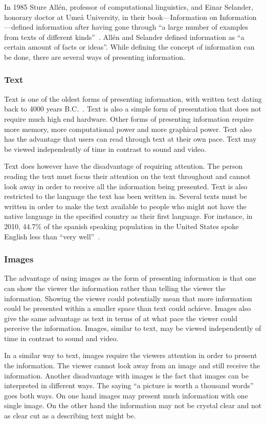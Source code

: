 In 1985 Sture All{\'e}n, professor of computational linguistics, and Einar Selander, honorary doctor at Ume{\aa} University, in their book---Information on Information---defined information after having gone through ``a large number of examples from texts of different kinds''~\cite{informationDef1}. All{\'e}n and Selander defined information as ``a certain amount of facts or ideas''. While defining the concept of information can be done, there are several ways of presenting information.

\subsubsection{Text}
Text is one of the oldest forms of presenting information, with written text dating back to 4000 years B.C.~\cite{cuneiform}. Text is also a simple form of presentation that does not require much high end hardware. Other forms of presenting information require more memory, more computational power and more graphical power. Text also has the advantage that users can read through text at their own pace. Text may be viewed independently of time in contrast to sound and video.

Text does however have the disadvantage of requiring attention. The person reading the text must focus their attention on the text throughout and cannot look away in order to receive all the information being presented. Text is also restricted to the language the text has been written in. Several texts must be written in order to make the text available to people who might not have the native language in the specified country as their first language. For instance, in 2010, 44.7\% of the spanish speaking population in the United States spoke English less than ``very well''~\cite{spanishUS}.

\subsubsection{Images}
The advantage of using images as the form of presenting information is that one can show the viewer the information rather than telling the viewer the information. Showing the viewer could potentially mean that more information could be presented within a smaller space than text could achieve. Images also give the same advantage as text in terms of at what pace the viewer could perceive the information. Images, similar to text, may be viewed independently of time in contrast to sound and video.

In a similar way to text, images require the viewers attention in order to present the information. The viewer cannot look away from an image and still receive the information. Another disadvantage with images is the fact that images can be interpreted in different ways. The saying ``a picture is worth a thousand words'' goes both ways. On one hand images may present much information with one single image. On the other hand the information may not be crystal clear and not as clear cut as a describing text might be.

